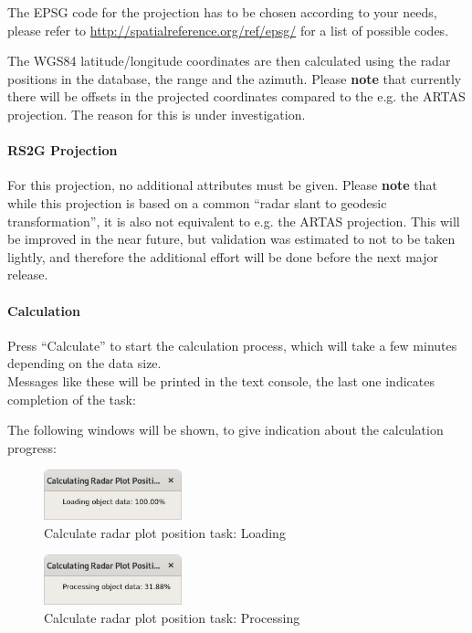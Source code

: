 {The EPSG code for the projection has to be chosen according to your needs, please refer to \url{http://spatialreference.org/ref/epsg/} for a list of possible codes.

The WGS84 latitude/longitude coordinates are then calculated using the radar positions in the database, the range and the azimuth. Please \textbf{note} that currently there will be offsets in the projected coordinates compared to the e.g. the ARTAS projection. The reason for this is under investigation.

\paragraph{RS2G Projection}

For this projection, no additional attributes must be given. Please \textbf{note} that while this projection is based on a common ``radar slant to geodesic transformation'', it is also not equivalent to e.g. the ARTAS projection. This will be improved in the near future, but validation was estimated to not to be taken lightly, and therefore the additional effort will be done before the next major release.

\paragraph{Calculation}

Press ``Calculate'' to start the calculation process, which will take a few minutes depending on the data size. \\

Messages like these will be printed in the text console, the last one indicates completion of the task:

The following windows will be shown, to give indication about the calculation progress:

\begin{figure}[H]
  \center
    \includegraphics[width=4cm,frame]{../screenshots/task_calc_radar_load.png}
  \caption{Calculate radar plot position task: Loading}
\end{figure}

\begin{figure}[H]
  \center
    \includegraphics[width=4cm,frame]{../screenshots/task_calc_radar_process.png}
  \caption{Calculate radar plot position task: Processing}
\end{figure}

}
